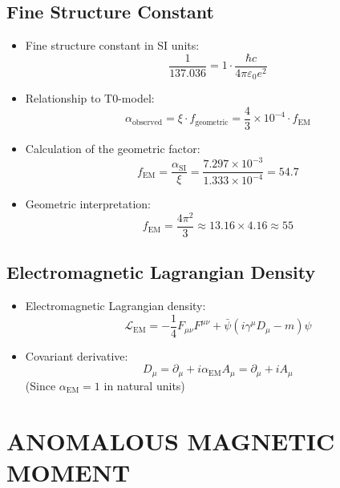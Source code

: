 \documentclass[12pt,a4paper]{article}
\begin{document}
	\subsection{Fine Structure Constant}
	\begin{itemize}
		\item Fine structure constant in SI units:
		$$\frac{1}{137.036} = 1 \cdot \frac{\hbar c}{4\pi\varepsilon_0 e^2}$$
		
		\item Relationship to T0-model:
		$$\alpha_{\text{observed}} = \xi \cdot f_{\text{geometric}} = \frac{4}{3} \times 10^{-4} \cdot f_{\text{EM}}$$
		
		\item Calculation of the geometric factor:
		$$f_{\text{EM}} = \frac{\alpha_{\text{SI}}}{\xi} = \frac{7.297 \times 10^{-3}}{1.333 \times 10^{-4}} = 54.7$$
		
		\item Geometric interpretation:
		$$f_{\text{EM}} = \frac{4\pi^2}{3} \approx 13.16 \times 4.16 \approx 55$$
	\end{itemize}
	
	\subsection{Electromagnetic Lagrangian Density}
	\begin{itemize}
		\item Electromagnetic Lagrangian density:
		$$\mathcal{L}_{\text{EM}} = -\frac{1}{4}F_{\mu\nu}F^{\mu\nu} + \bar{\psi}(i\gamma^\mu D_\mu - m)\psi$$
		
		\item Covariant derivative:
		$$D_\mu = \partial_\mu + i \alpha_{\text{EM}} A_\mu = \partial_\mu + i A_\mu$$
		(Since $\alpha_{\text{EM}} = 1$ in natural units)
	\end{itemize}
	
\section{ANOMALOUS MAGNETIC MOMENT}
\end{document}
